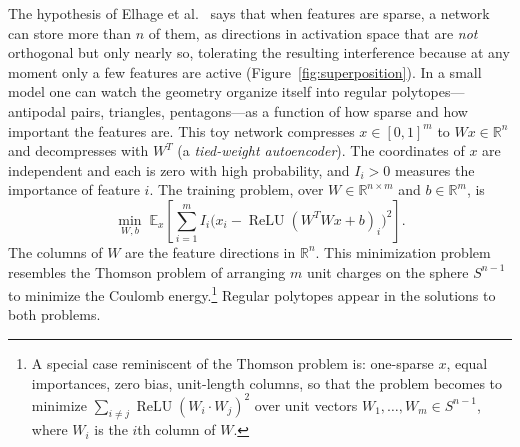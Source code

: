 The  hypothesis of Elhage et al.~\cite{elhage2022}
says that when features are sparse,
a network can store more than $n$ of them, as directions in
activation space that are \emph{not} orthogonal but only nearly so,
tolerating the resulting interference because at any moment only a few
features are active (Figure~\ref{fig:superposition}).
In a small  model one can watch the geometry organize
itself into regular polytopes---antipodal pairs, triangles, pentagons---as
a function of how sparse and how important the features are. This toy network
compresses $x\in[0,1]^m$ to $Wx\in\mathbb R^n$ and decompresses with $W^T$
(a \emph{tied-weight autoencoder}). The coordinates of $x$ are independent
and each is zero with high probability, and $I_i>0$ measures the importance of
feature $i$. The training problem, over $W\in\mathbb R^{n\times m}$ and $b\in\mathbb R^m$, is
\[
   \min_{W,b}\;
   \mathbb E_x\!\left[
      \sum_{i=1}^m I_i
      \bigl(x_i-\operatorname{ReLU}(W^TWx+b)_i\bigr)^2
   \right].
\]
The columns of $W$ are the feature directions in $\mathbb R^n$. This minimization problem resembles the Thomson problem of arranging $m$ unit charges on the sphere $S^{n-1}$ to minimize the Coulomb energy.\footnote{A special case reminiscent of the Thomson problem is: one-sparse $x$, equal importances, zero bias, unit-length columns, so that the problem becomes to minimize $\sum_{i\ne j}\operatorname{ReLU}(W_i\mathbin{\cdot}W_j)^2$ over unit vectors $W_1,\dots,W_m\in S^{n-1}$, where $W_i$ is the $i$th column of $W$.} Regular polytopes appear in the solutions to both problems.

